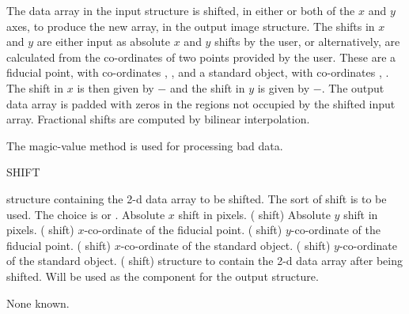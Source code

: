 {
\begin{manroutinedescription}
  The data array in the input {} structure is shifted, in either
  or both of the {$x$} and {$y$} axes, to produce the new array, in the
  output image structure. The shifts in {$x$} and {$y$} are either input as
  absolute {$x$} and {$y$} shifts by the user, or alternatively, are
  calculated from the co-ordinates of two points provided by the
  user. These are a fiducial point, with co-ordinates {},
  {}, and a standard object, with co-ordinates {},
  {}. The shift in {$x$} is then given by
  {}{$-$}{} and the shift in {$y$} is given by
  {}{$-$}{}. The output data array is padded with
  zeros in the regions not occupied by the shifted input array.  Fractional
  shifts are computed by bilinear interpolation.

  The magic-value method is used for processing bad data.

  SHIFT

\begin{manparametertable}
  {} structure containing the 2-d data array to be shifted.
  The sort of shift is to be used. The choice is {} or
  {}.
  Absolute {$x$} shift in pixels. ({} shift)
  Absolute {$y$} shift in pixels. ({} shift)
  {$x$}-co-ordinate of the fiducial point. ({} shift)
  {$y$}-co-ordinate of the fiducial point. ({} shift)
  {$x$}-co-ordinate of the standard object. ({} shift)
  {$y$}-co-ordinate of the standard object. ({} shift)
  {} structure to contain the 2-d data array after being
  shifted.
  Will be used as the {} component for the output
  {} structure. \mbox{{}}
\end{manparametertable}
  None known.


\end{manroutinedescription}}
